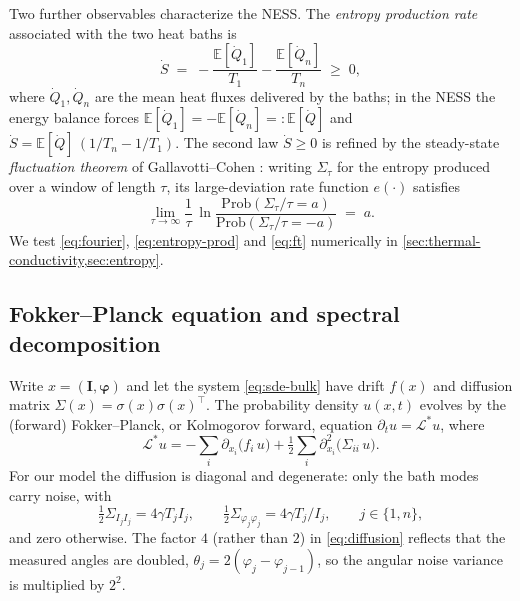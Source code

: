 \documentclass[11pt,a4paper]{article}
\theoremstyle{definition}
\newcommand{\E}{\mathbb{E}}
\numberwithin{equation}{section}   %
\newcommand{\bI}{\mathbf{I}}
\newcommand{\bphi}{\boldsymbol{\varphi}}
\newcommand{\Ladj}{\mathcal{L}^{*}}
\begin{document}
Two further observables characterize the NESS. The \emph{entropy production
rate} associated with the two heat baths is
\begin{equation}\label{eq:entropy-prod}
  \dot S \;=\; -\frac{\E[\dot Q_1]}{T_1} - \frac{\E[\dot Q_n]}{T_n} \;\ge\; 0,
\end{equation}
where $\dot Q_1,\dot Q_n$ are the mean heat fluxes delivered by the baths; in
the NESS the energy balance forces $\E[\dot Q_1]=-\E[\dot Q_n]=:\E[\dot Q]$ and
$\dot S = \E[\dot Q]\,(1/T_n - 1/T_1)$. The second law $\dot S\ge 0$ is refined
by the steady-state \emph{fluctuation theorem} of Gallavotti--Cohen
\cite{GallavottiCohen}: writing $\Sigma_\tau$ for the entropy produced over a
window of length $\tau$, its large-deviation rate function $e(\cdot)$ satisfies
\begin{equation}\label{eq:ft}
  \lim_{\tau\to\infty}\frac{1}{\tau}\,
  \ln\frac{\mathrm{Prob}(\Sigma_\tau/\tau = a)}{\mathrm{Prob}(\Sigma_\tau/\tau = -a)} \;=\; a .
\end{equation}
We test \eqref{eq:fourier}, \eqref{eq:entropy-prod} and \eqref{eq:ft}
numerically in \cref{sec:thermal-conductivity,sec:entropy}.

\subsection{Fokker--Planck equation and spectral decomposition}\label{sec:fp}

Write $x=(\bI,\bphi)$ and let the system \eqref{eq:sde-bulk} have drift $f(x)$
and diffusion matrix $\Sigma(x)=\sigma(x)\sigma(x)^{\!\top}$. The probability
density $u(x,t)$ evolves by the (forward) Fokker--Planck, or Kolmogorov forward,
equation $\partial_t u = \Ladj u$, where
\begin{equation}\label{eq:fp-operator}
  \Ladj u = -\sum_i \partial_{x_i}\!\big(f_i\,u\big)
            + \tfrac12\sum_{i} \partial^{2}_{x_i}\!\big(\Sigma_{ii}\,u\big).
\end{equation}
For our model the diffusion is diagonal and degenerate: only the bath modes
carry noise, with
\begin{equation}\label{eq:diffusion}
  \tfrac12\Sigma_{I_j I_j} = 4\gamma T_j I_j, \qquad
  \tfrac12\Sigma_{\varphi_j\varphi_j} = 4\gamma T_j/I_j,
  \qquad j\in\{1,n\},
\end{equation}
and zero otherwise. The factor $4$ (rather than $2$) in \eqref{eq:diffusion}
reflects that the measured angles are doubled, $\theta_j = 2(\varphi_j -
\varphi_{j-1})$, so the angular noise variance is multiplied by $2^2$.
\end{document}
